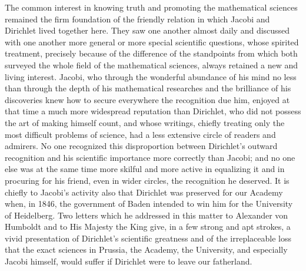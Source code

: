 \documentclass[11pt]{article}
\begin{document}
The common interest in knowing truth and promoting the mathematical sciences remained the firm foundation of the friendly relation in which Jacobi and Dirichlet lived together here. They saw one another almost daily and discussed with one another more general or more special scientific questions, whose spirited treatment, precisely because of the difference of the standpoints from which both surveyed the whole field of the mathematical sciences, always retained a new and living interest. Jacobi, who through the wonderful abundance of his mind no less than through the depth of his mathematical researches and the brilliance of his discoveries knew how to secure everywhere the recognition due him, enjoyed at that time a much more widespread reputation than Dirichlet, who did not possess the art of making himself count, and whose writings, chiefly treating only the most difficult problems of science, had a less extensive circle of readers and admirers. No one recognized this disproportion between Dirichlet's outward recognition and his scientific importance more correctly than Jacobi; and no one else was at the same time more skilful and more active in equalizing it and in procuring for his friend, even in wider circles, the recognition he deserved. It is chiefly to Jacobi's activity also that Dirichlet was preserved for our Academy when, in 1846, the government of Baden intended to win him for the University of Heidelberg. Two letters which he addressed in this matter to Alexander von Humboldt and to His Majesty the King give, in a few strong and apt strokes, a vivid presentation of Dirichlet's scientific greatness and of the irreplaceable loss that the exact sciences in Prussia, the Academy, the University, and especially Jacobi himself, would suffer if Dirichlet were to leave our fatherland.
\end{document}
